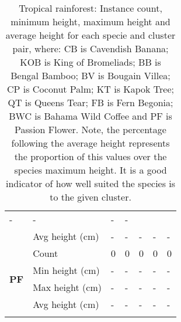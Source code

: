 \begin{longtable}{|p{2cm}|p{2cm}|p{1.5cm}|p{1.5cm}|p{1.5cm}|p{1.5cm}|p{1.5cm}|}
						\multicolumn{1}{l|}{-} &
						\multicolumn{1}{l|}{-} & 
						\multicolumn{1}{l|}{-} &
						\multicolumn{1}{l|}{-} \\\cline{2-7} &
						\multicolumn{1}{l|}{Avg height (cm)} & 
						\multicolumn{1}{l|}{-} & 
						\multicolumn{1}{l|}{-} &
						\multicolumn{1}{l|}{-} & 
						\multicolumn{1}{l|}{-} & 
						\multicolumn{1}{l|}{-} \\\cline{2-7}
		\hline    
		\multirow{4}{*}{\textbf{PF}} & 
						\multicolumn{1}{l|}{Count} & 
						\multicolumn{1}{l|}{0} & 
						\multicolumn{1}{l|}{0} &
						\multicolumn{1}{l|}{0} & 
						\multicolumn{1}{l|}{0} &
						\multicolumn{1}{l|}{0} \\\cline{2-7} &
						\multicolumn{1}{l|}{Min height (cm)} & 
						\multicolumn{1}{l|}{-} & 
						\multicolumn{1}{l|}{-} &
						\multicolumn{1}{l|}{-} & 
						\multicolumn{1}{l|}{-} &
						\multicolumn{1}{l|}{-} \\\cline{2-7} &
						\multicolumn{1}{l|}{Max height (cm)} & 
						\multicolumn{1}{l|}{-} & 
						\multicolumn{1}{l|}{-} &
						\multicolumn{1}{l|}{-} & 
						\multicolumn{1}{l|}{-} &
						\multicolumn{1}{l|}{-} \\\cline{2-7} &
						\multicolumn{1}{l|}{Avg height (cm)} & 
						\multicolumn{1}{l|}{-} & 
						\multicolumn{1}{l|}{-} &
						\multicolumn{1}{l|}{-} & 
						\multicolumn{1}{l|}{-} & 
						\multicolumn{1}{l|}{-} \\\cline{2-7}
		\hline                                                
	\caption{Tropical rainforest: Instance count, minimum height, maximum height and average height for each specie and cluster pair, where: CB is Cavendish Banana; KOB is King of Bromeliads; BB is Bengal Bamboo; BV is Bougain Villea; CP is Coconut Palm; KT is Kapok Tree; QT is Queens Tear; FB is Fern Begonia; BWC is Bahama Wild Coffee and PF is Passion Flower. Note, the percentage following the average height represents the proportion of this values over the species maximum height. It is a good indicator of how well suited the species is to the given cluster.}
	\label{tab:results_tropical_big_species_cluster_properties}	
\end{longtable}

